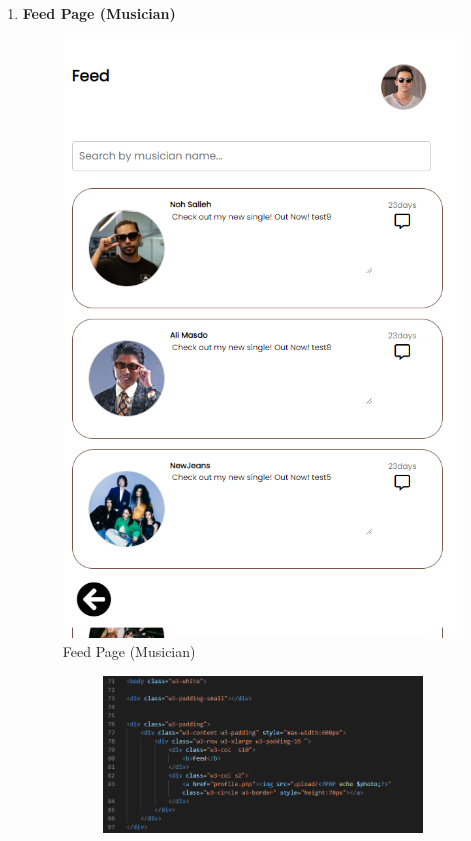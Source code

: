 \begin{enumerate}[1.]
    \item \textbf{Feed Page (Musician)}
    \begin{figure}[h]
        \centering
        \includegraphics[width=0.5\linewidth]{mainmatter/images/frontend/ss/Feed (Musician).png}
        \caption{Feed Page (Musician)}
        \label{fig:myfig56}
    \end{figure}
    \begin{figure}[h]\ContinuedFloat
        \centering
        \begin{subfigure}[b]{0.7\textwidth}
            \centering
            \includegraphics[width=\textwidth]{mainmatter/images/frontend/code/musicfeed.png}
            \label{fig:sub1}
        \end{subfigure}
        \hspace{0.04\textwidth}
        \begin{subfigure}[b]{0.7\textwidth}
            \centering

\end{subfigure}
\end{figure}
\end{enumerate}
